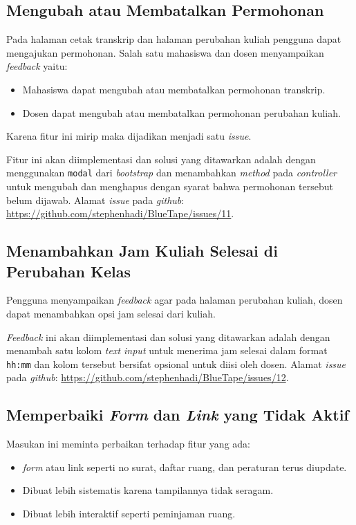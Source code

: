 \subsection{Mengubah atau Membatalkan Permohonan}
\label{issue:11}
Pada halaman cetak transkrip dan halaman  perubahan kuliah pengguna dapat mengajukan permohonan. Salah satu mahasiswa dan dosen menyampaikan \textit{feedback} yaitu:
\begin{itemize}
	\item Mahasiswa dapat mengubah atau membatalkan permohonan transkrip. 
	\item Dosen dapat mengubah atau membatalkan permohonan perubahan kuliah.
\end{itemize}
Karena fitur ini mirip maka dijadikan menjadi satu \textit{issue}. 

Fitur ini akan diimplementasi dan solusi yang ditawarkan adalah dengan menggunakan \texttt{modal} dari \textit{bootstrap} dan menambahkan \textit{method} pada \textit{controller} untuk mengubah dan menghapus dengan syarat bahwa permohonan tersebut belum dijawab. Alamat \textit{issue} pada \textit{github}: \url{https://github.com/stephenhadi/BlueTape/issues/11}.

\subsection{Menambahkan Jam Kuliah Selesai di Perubahan Kelas}
\label{issue:12}
Pengguna menyampaikan \textit{feedback} agar pada halaman perubahan kuliah, dosen dapat menambahkan opsi jam selesai dari kuliah.

\textit{Feedback} ini akan diimplementasi dan solusi yang ditawarkan adalah dengan menambah satu kolom \textit{text input} untuk menerima jam selesai dalam format \texttt{hh:mm} dan kolom tersebut bersifat opsional untuk diisi oleh dosen. Alamat \textit{issue} pada \textit{github}: \url{https://github.com/stephenhadi/BlueTape/issues/12}.

\subsection{Memperbaiki \textit{Form} dan \textit{Link} yang Tidak Aktif}
\label{issue:13}
Masukan ini meminta perbaikan terhadap fitur yang ada: 
\begin{itemize}
	\item \textit{form} atau link seperti no surat, daftar ruang, dan peraturan terus diupdate.
	\item Dibuat lebih sistematis karena tampilannya tidak seragam.
	\item Dibuat lebih interaktif seperti peminjaman ruang.
\end{itemize}   


